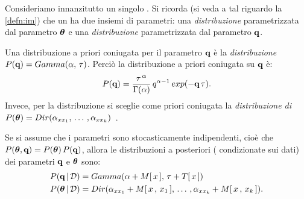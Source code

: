 Consideriamo innanzitutto un singolo \mprocess*{}. Si ricorda (si veda a tal riguardo la \autoref{defn:im}) che un \mprocess*{} ha due insiemi di parametri: una \emph{distribuzione } parametrizzata dal parametro $\boldsymbol{\textbf{\text{$\theta$}}}$ e una \emph{distribuzione } parametrizzata dal parametro $\boldsymbol{\textbf{\text{q}}}$.

Una distribuzione a priori coniugata per il parametro $\boldsymbol{\textbf{\text{q}}}$ è la \emph{distribuzione } $P(\boldsymbol{\textbf{\text{q}}})=Gamma(\alpha,\,\tau)$. Perciò la distribuzione a priori coniugata su $\boldsymbol{\textbf{\text{q}}}$ è:
\begin{equation}\label{eq:ctbn-bayesian-params-gamma}
P(\boldsymbol{\textbf{\text{q}}})=\frac{\tau^{\,\alpha}}{\Gamma(\alpha)} \, q^{\alpha-1} \, exp(-\boldsymbol{\textbf{\text{q}}} \, \tau) \text{.}
\end{equation}
Invece, per la distribuzione  si sceglie come priori coniugata la \emph{distribuzione di } $P(\boldsymbol{\textbf{\text{$\theta$}}})=Dir(\alpha_{\mathnormal{x}\mathnormal{x}_1},\,\dotsc\,,\alpha_{\mathnormal{x}\mathnormal{x}_k})$~\citep[si veda][]{Heckerman1996,Heckerman1995}.

Se si assume che i parametri sono stocasticamente indipendenti, cioè che $P(\boldsymbol{\textbf{\text{$\theta$}}},\boldsymbol{\textbf{\text{q}}})=P(\boldsymbol{\textbf{\text{$\theta$}}})\,P(\boldsymbol{\textbf{\text{q}}})$, allora le distribuzioni a posteriori (\ie{} condizionate sui dati) dei parametri $\boldsymbol{\textbf{\text{q}}}$ e $\boldsymbol{\textbf{\text{$\theta$}}}$ sono:
\begin{equation}\label{eq:ctbn-bayesian-params-posteriors}
\begin{aligned}
P(\param{q}\,\arrowvert\,\conceptsym{D})&=Gamma(\alpha+\mstat{x},\,\tau+\tstat{x}) \\
P(\param{$\theta$}\,\arrowvert\,\conceptsym{D})&=Dir(\alpha_{\setel{x}\setel{x}_1}+\mstat[x]{\setel{x}_1},\,\dotsc\,,\alpha_{\setel{x}\setel{x}_k}+\mstat[x]{\setel{x}_k})\text{.}
\end{aligned}
\end{equation}

